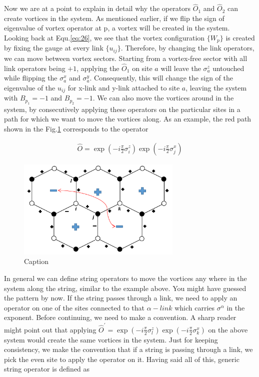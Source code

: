 \documentclass{article}
\begin{document}
Now we are at a point to explain in detail why the operators $\hat{O}_1$ and $\hat{O}_2$ can create vortices in the system. As mentioned earlier, if we flip the sign of eigenvalue of vortex operator at p, a vortex will be created in the system. Looking back at Equ.\hspace{0.2mm}\ref{eq:26}, we see that the vortex configuration $\{W_p\}$ is created by fixing the gauge at every link $\{u_{ij}\}$. Therefore, by changing the link operators, we can move between vortex sectors. Starting from a vortex-free sector with all link operators being $+1$, applying the $\hat{O}_1$ on site $a$ will leave the $\sigma^z_a$ untouched while flipping the $\sigma^x_a$ and $\sigma^y_a$. Consequently, this will change the sign of the eigenvalue of the $u_{ij}$ for x-link and y-link attached to site $a$, leaving the system with $B_{p_1} = -1$ and $B_{p_2} = -1$. We can also move the vortices around in the system, by consecutively applying these operators on the particular sites in a path for which we want to move the vortices along. As an example, the red path shown in the Fig.\hspace{0.2mm}\ref{fig:string} corresponds to the operator

\begin{equation}\label{eq:29}
	\begin{aligned}
		\hat{O} = \exp{(-i\frac{\pi}{2}\sigma^z_i)} \exp{(-i\frac{\pi}{2}\sigma^x_j)}
		\end{aligned}
\end{equation}

\begin{figure}[!htb]
    \centering
    \includegraphics[width=0.7\textwidth]{./images/Anyons_Strings}
    \caption{Caption}
    \label{fig:string}
\end{figure}{}

In general we can define string operators to move the vortices any where in the system along the string, similar to the example above. You might have guessed the pattern by now. If the string passes through a link, we need to apply an operator on one of the sites connected to that $\alpha-link$ which carries $\sigma^\alpha$ in the exponent. Before continuing, we need to make a convention. A sharp reader might point out that applying $\hat{O}^{'} = \exp{(-i\frac{\pi}{2}\sigma^z_l)} \exp{(-i\frac{\pi}{2}\sigma^x_k)}$ on the above system would create the same vortices in the system. Just for keeping consistency, we make the convention that if a string is passing through a link, we pick the even site to apply the operator on it. Having said all of this,  generic string operator is defined as
\end{document}
